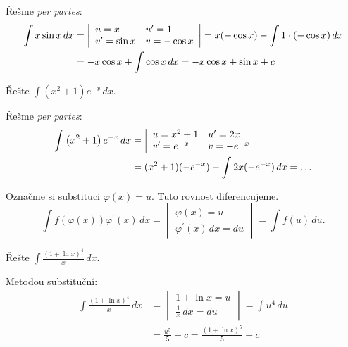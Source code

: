 \begin{reseni}
Řešme \textit{per partes}:
\begin{align*}
\int x \sin x \, dx &=\left |\begin{array}{l l}
    u=x & u^\prime= 1\\
    v^\prime = \sin x & v=-\cos x
\end{array} \right | = x(-\cos x)-\int 1\cdot(-\cos x)\, dx \\
&= -x\cos x+\int \cos x \, dx=-x \cos x +\sin x+c
\end{align*}
\end{reseni}

\begin{priklad}
Řešte $\int (x^2+1)e^{-x}\, dx.$
\end{priklad}

\begin{reseni}
Řešme \textit{per partes}:
\begin{align*}
    \int \left ( x^2+1 \right )e^{-x}\, dx &= \left |\begin{array}{l l}
        u=x^2+1 & u^\prime= 2x\\
        v^\prime = e^{-x} & v=-e^{-x}
    \end{array} \right | \\
    &= (x^2+1)(-e^{-x})-\int 2x(-e^{-x})\, dx = \dots
\end{align*}
\end{reseni}

\begin{pozn}
    Označme si substituci $\varphi(x)=u.$ Tuto rovnost diferencujeme.
    $$\int f(\varphi(x))\varphi^\prime(x)\, dx=\begin{vmatrix}
        \varphi(x)=u \\
        \varphi^\prime(x) \, dx=du
    \end{vmatrix}=\int f(u)\, du.$$
\end{pozn}

\begin{priklad}
Řešte $\int \frac{(1+\ln x)^4}{x}\, dx.$
\end{priklad}

\begin{reseni}
Metodou substituční:
\begin{align*}
    \int \frac{(1+\ln x)^4}{x}\, dx &= \begin{vmatrix}
        1+\ln x=u \\
        \frac{1}{x}\, dx=du
    \end{vmatrix}=\int u^4\, du \\
    &=\frac{u^5}{5}+c=\frac{(1+\ln x)^5}{5}+c
\end{align*}
\end{reseni}

